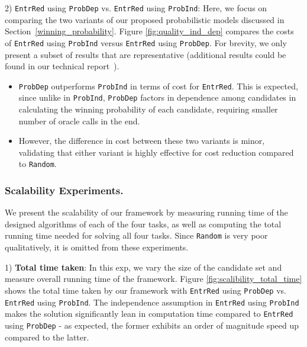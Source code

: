2) {\tt EntrRed} using {\tt ProbDep} vs. {\tt EntrRed} using {\tt ProbInd}: Here, we focus on comparing the two variants of our  proposed probabilistic models discussed in Section~\ref{winning_probability}. Figure \ref{fig:quality_ind_dep} compares the costs of {\tt EntrRed} using {\tt ProbInd} versus {\tt EntrRed} using {\tt ProbDep}. For brevity, we only present a subset of results that are representative (additional results could be found in our technical report~\cite{tr}).
\begin{itemize}
    \item  {\tt ProbDep} outperforms {\tt ProbInd} in terms of cost for {\tt EntrRed}. This is expected, since unlike in {\tt ProbInd},  {\tt ProbDep} factors in dependence among candidates in calculating the winning probability of each candidate, requiring smaller number of oracle calls in the end.
    \item However, the difference in cost between these two variants is minor, validating that either variant is highly effective for cost reduction compared to {\tt Random}.
\end{itemize}

\subsubsection{\noindent \textbf{Scalability Experiments.}} We present the scalability of our framework by measuring running time of the designed algorithms of each of the four tasks, as well as computing the total running time needed for solving all four tasks. Since {\tt Random} is very poor qualitatively, it is omitted from these experiments.

1) \textbf{Total time taken}: In this exp, we vary the size of the candidate set and measure overall running time of the framework. Figure \ref{fig:scalibility_total_time} shows the total time taken by our framework with {\tt EntrRed} using {\tt ProbDep} vs. {\tt EntrRed} using {\tt ProbInd}. The independence assumption in {\tt EntrRed} using {\tt ProbInd} makes the solution significantly lean in computation time compared to {\tt EntrRed} using {\tt ProbDep} - as expected, the former exhibits an order of magnitude speed up compared to the latter. 

\begin{comment}
2) \textbf{Identifying candidates}: Figures \ref{fig:scalibility_init_candidates_results} and \ref{fig:scalibility_init_candidates_last_two} depict the total time taken for identifying the candidates set. This time is negligible and scales well with an increasing number of candidates.    
\end{comment}

